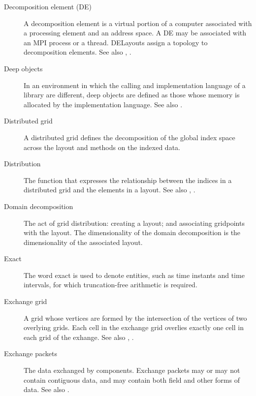\begin{description}
\item[Decomposition element (DE)] \label{glos:Decomp_Element}
  A decomposition element is a virtual portion of a computer 
  associated with a processing element and an address space.  A DE may 
  be associated with an MPI process or a thread.  DELayouts 
  assign a topology to decomposition elements. 
  See also , .

\item[Deep objects] \label{glos:DeepObjects} In an environment
  in which the calling and implementation language of a library are
  different, deep objects are defined as those whose memory is 
  allocated by the implementation language. 
  See also . 

\item[Distributed grid] \label{glos:DistGrid}
  A distributed grid defines the decomposition of the global index space 
  across the layout and methods on the indexed data.

\item[Distribution] \label{glos:Distribution} The function that expresses
  the relationship between the indices in a distributed grid and the elements 
  in a layout. See also , 
  . 

\item[Domain decomposition] \label{glos:DomainDecomp} The act of grid 
  distribution: creating a layout; and associating gridpoints with the layout. 
  The dimensionality of the domain decomposition is the dimensionality of 
  the associated layout.

\item [Exact] \label{glos:Exact} The word exact is used
  to denote entities, such as time instants and time intervals, for 
  which truncation-free arithmetic is required. 

\item[Exchange grid] \label{glos:ExchangeGrid} A grid whose vertices are
  formed by the intersection of the vertices of two overlying grids.  Each 
  cell in the exchange grid overlies exactly one cell in each grid of the 
  exhange. See also , .

\item[Exchange packets] \label{glos:EP} The data exchanged by components.  
  Exchange packets may or may not contain contiguous data, and may contain 
  both field and other forms of data. See also .


\end{description}
